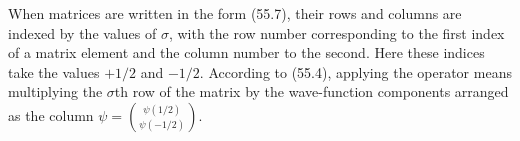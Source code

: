 When matrices are written in the form (55.7), their rows and columns are indexed by the values of $\sigma$, with the row number corresponding to the first index of a matrix element and the column number to the second. Here these indices take the values $+1/2$ and $-1/2$. According to (55.4), applying the operator means multiplying the $\sigma$th row of the matrix by the wave-function components arranged as the column
$\displaystyle\psi=\binom{\psi(1/2)}{\psi(-1/2)}$.
